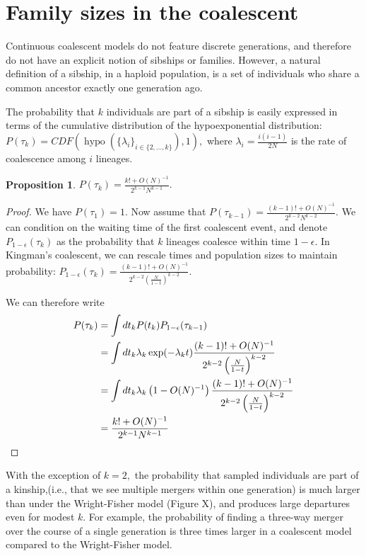 \documentclass[review,nonatbib]{elsarticle}
\newcommand{\hypo}{\operatorname{hypo}}
\newtheorem{proposition}{Proposition}
\begin{document}
\section{Family sizes in the coalescent}

Continuous coalescent models do not feature discrete generations, and therefore do not have an explicit notion of sibships or families. 
However, a natural definition of a sibship, in a haploid population, is a set of individuals who share a common ancestor exactly one generation ago.

The probability that $k$ individuals are part of a sibship is easily expressed in terms of the 
cumulative distribution of the hypoexponential distribution: $P(\tau_k) = CDF(\hypo(\{\lambda_i\}_{i\in\{2,\ldots,k\}}),1),$ where $\lambda_i=\frac{i (i-1)}{2N}$ is 
the rate of coalescence among $i$ lineages. 

\begin{proposition}
 $P(\tau_k) =  \frac{ k! +O(N)^{-1}}{2^{k-1}N^{k-1}}.$ 
 \end{proposition}

\begin{proof}
We have $P(\tau_1)=1$. Now assume that $P(\tau_{k-1}) =  \frac{ (k-1)! +O(N)^{-1}}{2^{k-2}N^{k-2}}.$ We can condition
on the waiting time of the first coalescent event, and denote $P_{1-\epsilon}(\tau_k)$ as the probability that $k$ lineages coalesce within time 
$1-\epsilon.$ In Kingman's coalescent, we can rescale times and population sizes to maintain probability:
 $P_{1-\epsilon}(\tau_k) =  \frac{ (k-1)! +O(N)^{-1}}{2^{k-2}\left(\frac{N}{1-t}\right)^{k-2}}.$ 

We can therefore write
\begin{equation}
\begin{split}
P(\tau_k) &= \int dt_k P(t_k) P_{1-\epsilon}(\tau_{k-1}) \\
&= \int dt_k \lambda_k \exp(-\lambda_k t)  \frac{ (k-1)! +O(N)^{-1}}{2^{k-2}\left(\frac{N}{1-t}\right)^{k-2}}  \\ 
&= \int dt_k \lambda_k\left(1-O(N)^{-1}\right)  \frac{ (k-1)! +O(N)^{-1}}{2^{k-2}\left(\frac{N}{1-t}\right)^{k-2}}  \\
&= \frac{ k! +O(N)^{-1}}{2^{k-1}N^{k-1}} \qedhere
\end{split}
\end{equation}
 \end{proof}
 
    

With the exception of $k=2,$ the probability that sampled individuals are part of a kinship,(i.e., that we see multiple mergers within one generation) is much larger than under the Wright-Fisher model (Figure X), and produces large departures even for modest $k$. 
For example,  the probability of finding a three-way merger over the course of a single generation is three times larger in a coalescent model compared to the 
Wright-Fisher model. 
\end{document}
